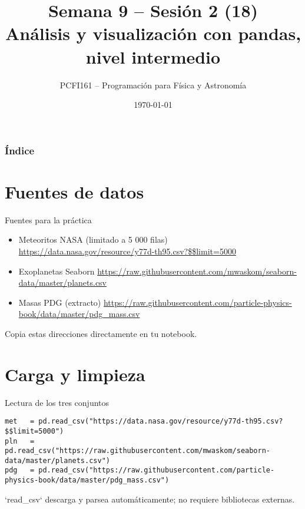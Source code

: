 \documentclass[10pt]{beamer}
\title{Semana 9 – Sesión 2 (18)\\Análisis y visualización con pandas, nivel intermedio}
\author{PCFI161 – Programación para Física y Astronomía}
\date{\today}
\begin{document}
\myfront{}

\begin{frame}\titlepage\end{frame}

\begin{frame}\frametitle{Índice}\tableofcontents\end{frame}

\section{Fuentes de datos}
\begin{frame}{Fuentes para la práctica}
\begin{itemize}
  \item Meteoritos NASA (limitado a 5 000 filas)\newline
        \url{https://data.nasa.gov/resource/y77d-th95.csv?\$\$limit=5000}
  \item Exoplanetas Seaborn\newline
        \url{https://raw.githubusercontent.com/mwaskom/seaborn-data/master/planets.csv}
  \item Masas PDG (extracto)\newline
        \url{https://raw.githubusercontent.com/particle-physics-book/data/master/pdg_mass.csv}
\end{itemize}
Copia estas direcciones directamente en tu notebook.
\end{frame}

\section{Carga y limpieza}
\begin{frame}[fragile]{Lectura de los tres conjuntos}
\begin{verbatim}
met   = pd.read_csv("https://data.nasa.gov/resource/y77d-th95.csv?$$limit=5000")
pln   = pd.read_csv("https://raw.githubusercontent.com/mwaskom/seaborn-data/master/planets.csv")
pdg   = pd.read_csv("https://raw.githubusercontent.com/particle-physics-book/data/master/pdg_mass.csv")
\end{verbatim}
`read\_csv` descarga y parsea automáticamente; no requiere bibliotecas externas.
\end{frame}
\end{document}
